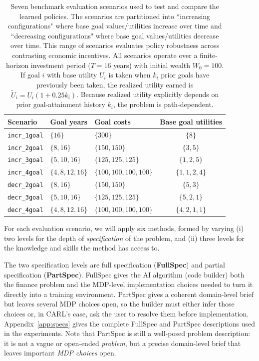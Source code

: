 \documentclass[mnsc,sglanonrev]{informs4}
\begin{document}
\begin{table}[ht]
\begin{center}
\small
\begin{tabular}{@{}lllc@{}}
\toprule
\textbf{Scenario} & \textbf{Goal years} & \textbf{Goal costs} & \textbf{Base goal utilities}\\
\midrule
\texttt{incr\_1goal} & $\{16\}$ & $\{300\}$ & $\{8\}$\\
\texttt{incr\_2goal} & $\{8,16\}$ & $\{150,150\}$ & $\{3,5\}$\\
\texttt{incr\_3goal} & $\{5,10,16\}$ & $\{125,125,125\}$ & $\{1,2,5\}$\\
\texttt{incr\_4goal} & $\{4,8,12,16\}$ & $\{100,100,100,100\}$ & $\{1,1,2,4\}$\\
\texttt{decr\_2goal} & $\{8,16\}$ & $\{150,150\}$ & $\{5,3\}$\\
\texttt{decr\_3goal} & $\{5,10,16\}$ & $\{125,125,125\}$ & $\{5,2,1\}$\\
\texttt{decr\_4goal} & $\{4,8,12,16\}$ & $\{100,100,100,100\}$ & $\{4,2,1,1\}$\\
\bottomrule
\end{tabular}
\end{center}
\caption{Seven benchmark evaluation scenarios used to test and compare the learned policies. The scenarios are partitioned into ``increasing configurations" where base goal values/utilities increase over time and ``decreasing configurations" where base goal values/utilities decrease over time. This range of scenarios evaluates policy robustness across contrasting economic incentives. All scenarios operate over a finite-horizon investment period ($T=16$ years) with initial wealth $W_0 = 100$. If goal $i$ with base utility $U_i$ is taken when $k_i$ prior goals have previously been taken, the realized utility earned is $\widetilde{U}_i = U_i (1 + 0.25 k_i)$. Because realized utility explicitly depends on prior goal-attainment history $k_i$, the problem is path-dependent. }
\label{tab:gbwm-examples}
\end{table}

For each evaluation scenario, we will apply six methods, formed by varying  (i) two levels for the depth of {\it specification} of the problem, and (ii) three levels for the knowledge and skills the method has access to. 

The two specification levels are full specification (\textbf{FullSpec}) and partial specification (\textbf{PartSpec}). FullSpec gives the AI algorithm (code builder) both the finance problem and the MDP-level implementation choices needed to turn it directly into a training environment. PartSpec gives a coherent domain-level brief but leaves several MDP choices open, so the builder must either infer those choices or, in CARL's case, ask the user to resolve them before implementation. Appendix~\ref{app:specs} gives the complete FullSpec and PartSpec descriptions used in the experiments. Note that PartSpec is still a well-posed problem description: it is not a vague or open-ended \textit{problem}, but a precise domain-level brief that leaves important \textit{MDP choices} open.
\end{document}
